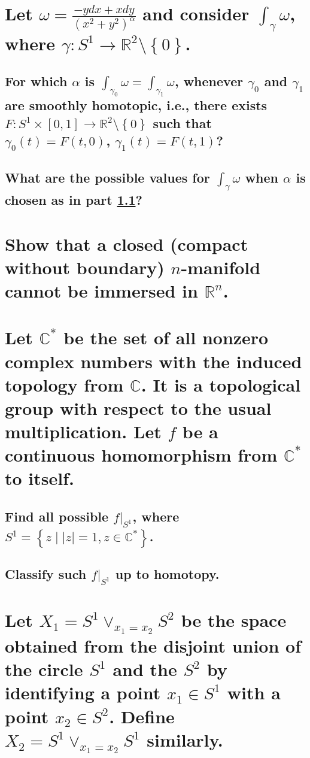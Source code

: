 \documentclass[10pt]{article}
\begin{document}
\section{Let $\omega = \frac{-y dx + x dy}{(x^2 + y^2)^\alpha} $ and consider $\int_\gamma \omega$,
  where $\gamma : S^1 \to \mathbb{R}^2 \setminus \left\{ 0 \right\} $.}

\subsection{For which $\alpha$ is $\int_{\gamma_0} \omega = \int_{\gamma_1} \omega$, whenever
  $\gamma_0$ and $\gamma_1$ are smoothly homotopic, i.e., there exists $F:S^1 \times [0,1] \to
  \mathbb{R}^2\setminus \left\{ 0 \right\}$ such that $\gamma_0(t) = F(t,0)$, $\gamma_1(t) = F(t,1)$?}
  \label{cre}

\subsection{What are the possible values for $\int_\gamma \omega$ when $\alpha$ is chosen as in part
  \ref{cre}?}

\section{Show that a closed (compact without boundary) $n$-manifold cannot be immersed in
  $\mathbb{R}^n$.}

\section{Let $\mathbb{C}^*$ be the set of all nonzero complex numbers with the induced topology from
  $\mathbb{C}$. It is a topological group with respect to the usual multiplication. Let $f$ be a
  continuous homomorphism from $\mathbb{C}^*$ to itself.}

\subsection{Find all possible $f|_{S^1}$, where $S^1 = \left\{ z \mid |z| = 1, z \in \mathbb{C}^*
  \right\} $.}

\subsection{Classify such $f|_{S^1}$ up to homotopy.}

\section{Let $X_1 = S^1 \vee_{x_1 = x_2} S^2$ be the space obtained from the disjoint union of the
  circle $S^1$ and the $S^2$ by identifying a point $x_1 \in S^1$ with a point $x_2 \in S^2$. Define
  $X_2 = S^1 \vee_{x_1 = x_2} S^1$ similarly.}
\end{document}
